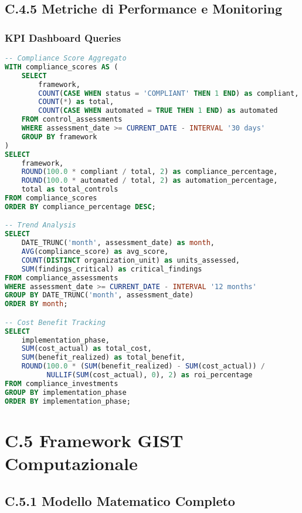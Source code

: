 \subsection{\texorpdfstring{\textbf{C.4.5 Metriche di Performance e Monitoring}}{C.4.5 - Metriche di Performance e Monitoring}}

\subsubsection{KPI Dashboard Queries}

\begin{lstlisting}[language=SQL, caption=Query per Compliance Dashboard]
-- Compliance Score Aggregato
WITH compliance_scores AS (
    SELECT 
        framework,
        COUNT(CASE WHEN status = 'COMPLIANT' THEN 1 END) as compliant,
        COUNT(*) as total,
        COUNT(CASE WHEN automated = TRUE THEN 1 END) as automated
    FROM control_assessments
    WHERE assessment_date >= CURRENT_DATE - INTERVAL '30 days'
    GROUP BY framework
)
SELECT 
    framework,
    ROUND(100.0 * compliant / total, 2) as compliance_percentage,
    ROUND(100.0 * automated / total, 2) as automation_percentage,
    total as total_controls
FROM compliance_scores
ORDER BY compliance_percentage DESC;

-- Trend Analysis
SELECT 
    DATE_TRUNC('month', assessment_date) as month,
    AVG(compliance_score) as avg_score,
    COUNT(DISTINCT organization_unit) as units_assessed,
    SUM(findings_critical) as critical_findings
FROM compliance_assessments
WHERE assessment_date >= CURRENT_DATE - INTERVAL '12 months'
GROUP BY DATE_TRUNC('month', assessment_date)
ORDER BY month;

-- Cost Benefit Tracking
SELECT 
    implementation_phase,
    SUM(cost_actual) as total_cost,
    SUM(benefit_realized) as total_benefit,
    ROUND(100.0 * (SUM(benefit_realized) - SUM(cost_actual)) / 
          NULLIF(SUM(cost_actual), 0), 2) as roi_percentage
FROM compliance_investments
GROUP BY implementation_phase
ORDER BY implementation_phase;
\end{lstlisting}

\section{\texorpdfstring{\textbf{C.5 Framework GIST Computazionale}}{C.5 - Framework GIST Computazionale}}

\subsection{\texorpdfstring{\textbf{C.5.1 Modello Matematico Completo}}{C.5.1 - Modello Matematico Completo}}

